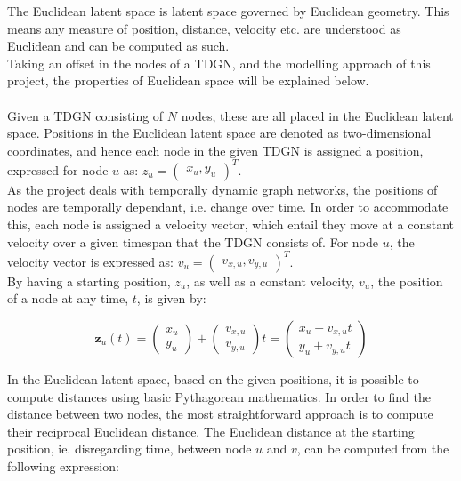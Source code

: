 The Euclidean latent space is latent space governed by Euclidean geometry.
This means any measure of position, distance, velocity etc. are understood as Euclidean and can be computed as such. 
\\
Taking an offset in the nodes of a TDGN, and the modelling approach of this project, the properties of Euclidean space will be explained below.
\\\\
Given a TDGN consisting of $N$ nodes, these are all placed in the Euclidean latent space. 
Positions in the Euclidean latent space are denoted as two-dimensional coordinates, and hence each node in the given TDGN is assigned a position, expressed for node $u$ as:
$z_u = \begin{pmatrix}
x_u, y_u
\end{pmatrix}^T$.
\\
As the project deals with temporally dynamic graph networks, the positions of nodes are temporally dependant, i.e. change over time. 
In order to accommodate this, each node is assigned a velocity vector, which entail they move at a constant velocity over a given timespan that the TDGN consists of.
For node $u$, the velocity vector is expressed as:
$v_u = \begin{pmatrix}
v_{x,u}, v_{y,u}
\end{pmatrix}^T$.
\\
By having a starting position, $z_u$, as well as a constant velocity, $v_u$, the position of a node at any time, $t$, is given by: 

\begin{equation}
    \textbf{z}_u(t) = \begin{pmatrix}
    x_u\\
    y_u
    \end{pmatrix}
    +
    \begin{pmatrix}
    v_{x,u}\\
    v_{y,u}
    \end{pmatrix}
    t
    = 
    \begin{pmatrix}
    x_u + v_{x,u}t\\
    y_u + v_{y,u}t
    \end{pmatrix}
\end{equation}

In the Euclidean latent space, based on the given positions, it is possible to compute distances using basic Pythagorean mathematics. 
In order to find the distance between two nodes, the most straightforward approach is to compute their reciprocal Euclidean distance.
The Euclidean distance at the starting position, ie. disregarding time, between node $u$ and $v$, can be computed from the following expression:

